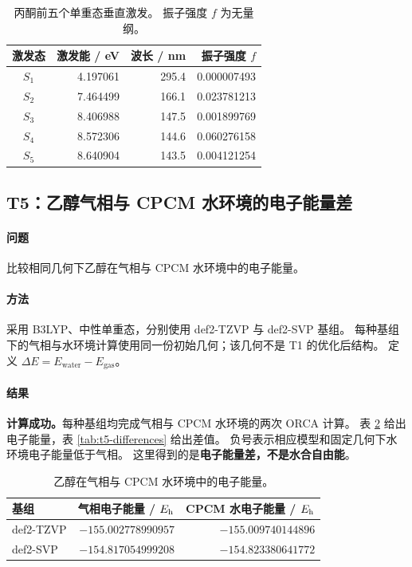 \begin{table}[H]
  \centering\small
  \caption{丙酮前五个单重态垂直激发。%
  振子强度 $f$ 为无量纲。%
  }
  \label{tab:t4-excitations}
  \begin{tabular}{crrr}
    \toprule
    激发态 & 激发能 / eV & 波长 / nm & 振子强度 $f$\\
    \midrule
    $S_{1}$ & 4.197061 & 295.4 & 0.000007493\\
    $S_{2}$ & 7.464499 & 166.1 & 0.023781213\\
    $S_{3}$ & 8.406988 & 147.5 & 0.001899769\\
    $S_{4}$ & 8.572306 & 144.6 & 0.060276158\\
    $S_{5}$ & 8.640904 & 143.5 & 0.004121254\\
    \bottomrule
  \end{tabular}
\end{table}

\subsection{T5：乙醇气相与 CPCM 水环境的电子能量差}
\paragraph{问题}
比较相同几何下乙醇在气相与 CPCM 水环境中的电子能量。

\paragraph{方法}
采用 B3LYP、中性单重态，分别使用 def2-TZVP 与 def2-SVP 基组。%
每种基组下的气相与水环境计算使用同一份初始几何；该几何不是 T1 的优化后结构。%
定义 $\Delta E=E_{\mathrm{water}}-E_{\mathrm{gas}}$。

\paragraph{结果}
\textbf{计算成功。}每种基组均完成气相与 CPCM 水环境的两次 ORCA 计算。%
表 \ref{tab:t5-energies} 给出电子能量，表 \ref{tab:t5-differences} 给出差值。%
负号表示相应模型和固定几何下水环境电子能量低于气相。%
这里得到的是\textbf{电子能量差，不是水合自由能}。

\begin{table}[H]
  \centering\small
  \caption{乙醇在气相与 CPCM 水环境中的电子能量。%
  }
  \label{tab:t5-energies}
  \begin{tabular}{lrr}
    \toprule
    基组 & 气相电子能量 / $E_{\mathrm h}$ & CPCM 水电子能量 / $E_{\mathrm h}$\\
    \midrule
    def2-TZVP & $-155.002778990957$ & $-155.009740144896$\\
    def2-SVP & $-154.817054999208$ & $-154.823380641772$\\
    \bottomrule
  \end{tabular}
\end{table}

